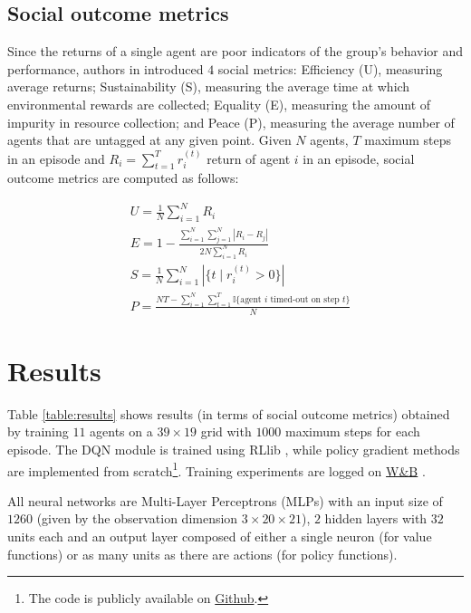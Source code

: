\documentclass{article}
\begin{document}
\subsection{Social outcome metrics}
Since the returns of a single agent are poor indicators of the group's behavior and performance, authors in \cite{harvest} introduced $4$ social metrics: Efficiency (U), measuring average returns; Sustainability (S), measuring the average time at which environmental rewards are collected; Equality (E), measuring the amount of impurity in resource collection; and Peace (P), measuring the average number of agents that are untagged at any given point. Given $N$ agents, $T$ maximum steps in an episode and $R_i=\sum_{t=1}^T r_i^{(t)}$ return of agent $i$ in an episode, social outcome metrics are computed as follows:

\begin{equation}
  \label{eq:metrics}
  \begin{aligned}
    & U = \frac{1}{N}\sum_{i=1}^N R_i\\
    & E = 1 - \frac{\sum_{i=1}^N\sum_{j=1}^N |R_i-R_j|}{2N\sum_{i=1}^N R_i} \\
    & S = \frac{1}{N}\sum_{i=1}^N |\{t\mid r_i^{(t)}>0\}| \\
    & P = \frac{NT-\sum_{i=1}^N\sum_{t=1}^T \mathbb{I}\{\text{agent } i \text{ timed-out on step } t\}}{N}
  \end{aligned}
\end{equation}

\section{Results}

Table \ref{table:results} shows results (in terms of social outcome metrics) obtained by training $11$ agents on a $39\times19$ grid with $1000$ maximum steps for each episode. The DQN module is trained using RLlib \cite{rllib}, while policy gradient methods are implemented from scratch\footnote{The code is publicly available on \href{https://github.com/Wadaboa/cpr-appropriation}{Github}.}. Training experiments are logged on \href{https://wandb.ai/wadaboa/cpr-appropriation}{W\&B} \cite{wandb}.

All neural networks are Multi-Layer Perceptrons (MLPs) with an input size of $1260$ (given by the observation dimension $3\times20\times21$), $2$ hidden layers with $32$ units each and an output layer composed of either a single neuron (for value functions) or as many units as there are actions (for policy functions).
\end{document}
